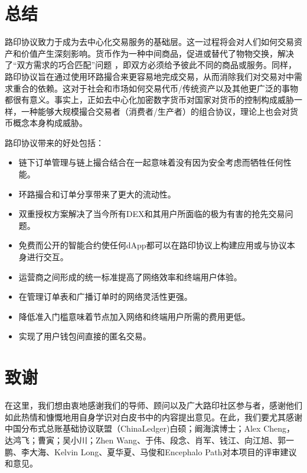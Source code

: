 \documentclass[UTF8]{ctexart}
\begin{document}
\begin{multicols}{2}
\section{总结}

路印协议致力于成为去中心化交易服务的基础层。这一过程将会对人们如何交易资产和价值产生深刻影响。货币作为一种中间商品，促进或替代了物物交换，解决了“双方需求的巧合匹配”问题 \cite{unenumerated2006}，即双方必须给予彼此不同的商品或服务。同样，路印协议旨在通过使用环路撮合来更容易地完成交易，从而消除我们对交易对中需求重合的依赖。这对于社会和市场如何交易代币/传统资产以及其他更广泛的事物都很有意义。事实上，正如去中心化加密数字货币对国家对货币的控制构成威胁一样，一种能够大规模撮合交易者（消费者/生产者）的组合协议，理论上也会对货币概念本身构成威胁。

路印协议带来的好处包括：

\begin{itemize}
	\item 链下订单管理与链上撮合结合在一起意味着没有因为安全考虑而牺牲任何性能。
	\item 环路撮合和订单分享带来了更大的流动性。
	\item 双重授权方案解决了当今所有DEX和其用户所面临的极为有害的抢先交易问题。
	\item 免费而公开的智能合约使任何dApp都可以在路印协议上构建应用或与协议本身进行交互。
	\item 运营商之间形成的统一标准提高了网络效率和终端用户体验。
	\item 在管理订单表和广播订单时的网络灵活性更强。
	\item 降低准入门槛意味着节点加入网络和终端用户所需的费用更低。
	\item 实现了用户钱包间直接的匿名交易。
\end{itemize}

\section{致谢}
在这里，我们想由衷地感谢我们的导师、顾问以及广大路印社区参与者，感谢他们如此热情和慷慨地用自身学识对白皮书中的内容提出意见。在此，我们要尤其感谢中国分布式总账基础协议联盟（ChinaLedger)白硕；阚海滨博士；Alex  Cheng，达鸿飞；曹寅；吴小川；Zhen  Wang、于伟、段念、肖军、钱江、向江旭、郭一鹏、李大海、Kelvin Long、夏华夏、马俊和Encephalo Path对本项目的评审建议和意见。






\end{multicols}
\end{document}
